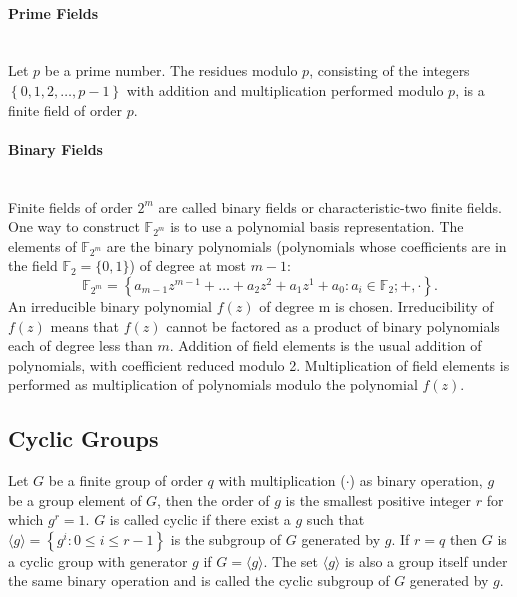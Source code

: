 \paragraph{Prime Fields}\mbox{}\\
Let $p$ be a prime number. The residues modulo $p$, consisting of the integers $\left\lbrace 0,1,2,\dots,p-1\right\rbrace $ with addition and multiplication performed modulo $p$, is a finite field of order $p$.
\paragraph{Binary Fields}\mbox{}\\
Finite fields of order $2^m$ are called binary fields or characteristic-two finite fields. One way to construct $\mathbb{F}_{2^m}$ is to use a polynomial basis representation. The elements of $\mathbb{F}_{2^m}$ are the binary polynomials (polynomials whose coefficients are in the field $\mathbb{F}_2=\{0,1\}$) of degree at most $m-1$:
$$\mathbb{F}_{2^m}=\left\lbrace a_{m-1}z^{m-1}+\dots+a_2z^2+a_1z^1+a_0 : a_i \in \mathbb{F}_2 ;+, \cdot \right\rbrace. $$
An irreducible binary polynomial $f(z)$ of degree m is chosen. Irreducibility of $f(z)$ means that $f(z)$ cannot be factored as a product of binary polynomials each of degree less than $m$. Addition of field elements is the usual addition of polynomials, with coefficient reduced modulo 2. Multiplication of field elements is performed as multiplication of polynomials modulo the polynomial $f(z)$. 
\subsection*{Cyclic Groups}
Let $G$ be a finite group of order $q$ with multiplication ($\cdot$) as binary operation, $g$ be a group element of $G$, then the order of $g$ is the smallest positive integer $r$ for which $g^r = 1$.  
$G$ is called cyclic if there exist a $g$ such that $\langle g \rangle = \left\lbrace g^i : 0 \leq i \leq r-1 \right\rbrace $ is the subgroup of $G$ generated by $g$. If $r=q$ then $G$ is a cyclic group with generator $g$ if $G = \langle g \rangle$. The set $\langle
 g \rangle$ is also a group itself under the same binary operation and is called the cyclic subgroup of $G$ generated by $g$.
 

